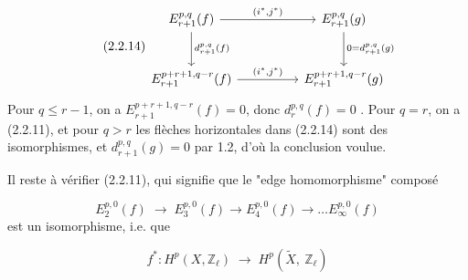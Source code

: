 \begin{equation}\tag{2.2.14}
\begin{tikzcd}[column sep=huge, row sep=large]
E_{r+1}^{p,q}(f) \arrow[r, "{(i^*,j^*)}"] \arrow[d, "{d_{r+1}^{p,q}(f)}"] & E_{r+1}^{p,q}(g) \arrow[d, "{0 = d_{r+1}^{p,q}(g)}"] \\
E_{r+1}^{p+r+1,q-r}(f) \arrow[r, "{(i^*,j^*)}"] & E_{r+1}^{p+r+1,q-r}(g)
\end{tikzcd}
\end{equation}
Pour $q \leq r-1$, on a $E_{r+1}^{p+r+1,q-r}(f) = 0$, donc $d_r^{p,q}(f) = 0$ . Pour $q = r$, on a (2.2.11), et pour $q > r$ les flèches horizontales dans (2.2.14) sont des isomorphismes, et $d_{r+1}^{p,q}(g)= 0$ par 1.2, d'où la conclusion voulue.

Il reste à vérifier (2.2.11), qui signifie que le "edge homomorphisme" composé

\begin{equation}\tag{2.2.15}
E_2^{p,0}(f) \;\longrightarrow\; E_3^{p,0}(f) \longrightarrow E_4^{p,0}(f) \longrightarrow \ldots E_\infty^{p,0}(f)
\end{equation}
est un isomorphisme, i.e. que

\begin{equation}\tag{2.2.16}
f^* : H^p(X,\mathbb{Z}_\ell) \;\longrightarrow\; H^p(\widetilde{X},\ \mathbb{Z}_\ell) 
\end{equation}

